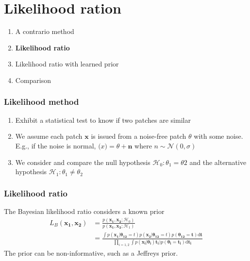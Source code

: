 \documentclass[compress]{beamer} %
\begin{document}
 \section{Likelihood ration}
 
\begin{frame}
 \scriptsize
 {
 \begin{enumerate}


  \item A contrario method
  \item \textbf{Likelihood ratio}
  \item Likelihood ratio with learned prior
  \item Comparison
  
 \end{enumerate}

  
 }
 \end{frame} 
 
 \begin{frame}
\frametitle{Likelihood method}
 \scriptsize
 {
 \begin{enumerate}
 \item Exhibit a statistical test to know if two patches are similar
 \item We assume each patch $\mathbf{x}$ is issued from a noise-free patch $\theta$ with some noise. E.g., if the noise is normal, $\mathbf(x) = \theta + \mathbf{n}$ where $n \sim \mathcal{N}(0,\sigma)$
 \item We consider and compare the null hypothesis $\mathcal{H}_0 : \theta_1=\theta2$ and the alternative hypothesis $\mathcal{H}_1 : \theta_1\neq\theta_2$
 \end{enumerate}
 }
\end{frame}
\begin{frame}
\frametitle{Likelihood ratio}
The Bayesian likelihood ratio considers a known prior
\begin{align*}
L_B(\mathbf{x_1},\mathbf{x_2})&=\frac{p(\mathbf{x_1},\mathbf{x_2};\mathcal{H}_0)}{p(\mathbf{x_1},\mathbf{x_2};\mathcal{H}_1)}\\
&=\frac{\int p(\mathbf{x_1}|\mathbf{\theta_{12}}=t)p(\mathbf{x_2}|\mathbf{\theta_{12}}=t)p(\mathbf{\theta_{12}}=\mathbf{t})\mathrm{d}\mathbf{t}}{\prod_{i=1,2}\int p(\mathbf{x_i}|\mathbf{\theta_i})\mathbf{t_i})p(\mathbf{\theta_i}=\mathbf{t_i})\mathrm{d}\mathbf{t_i}}
\end{align*}
The prior can be non-informative, such as a Jeffreys prior.
\end{frame}
\end{document}
